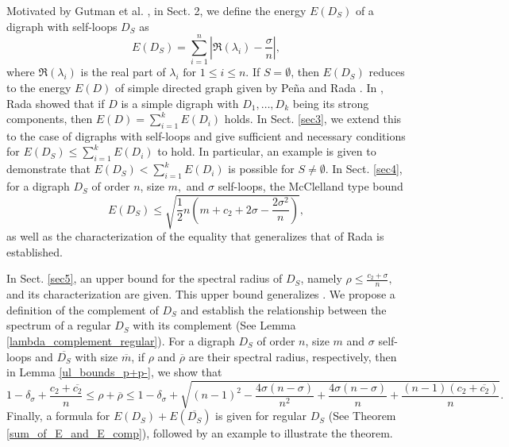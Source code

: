 \documentclass[12pt,a4paper,reqno]{amsart}
\numberwithin{equation}{section}
\theoremstyle{plain}
\theoremstyle{definition}
\newcommand{\<}{\langle}
\renewcommand{\>}{\rangle}
\begin{document}
    Motivated by Gutman et al. \cite{gutman2021energy}, in Sect. 2, we define the energy $E(D_S)$ of a digraph with self-loops $D_S$ as 
    \begin{equation*}
    E(D_S)=\sum_{i=1}^n \left | \Re(\lambda_i)-\frac{\sigma}{n} \right|,
    \end{equation*}
    where $\Re(\lambda_i)$ is the real part of $\lambda_i \text{ for } 1 \leq i \leq n$. If $S=\emptyset$, then $E(D_S)$ reduces to the energy $E(D)$ of simple directed graph given by Pe\~{n}a and Rada \cite{pena2008energy}. In \cite{rada2009mcclelland}, Rada showed that if $D$ is a simple digraph with $D_1, \ldots, D_k$ being its strong components, then $E(D)=\sum_{i=1}^k E(D_i)$ holds. In Sect. \ref{sec3}, we extend this to the case of digraphs with self-loops and give sufficient and necessary conditions for $E(D_S)\leq \sum_{i=1}^k E(D_i)$ to hold. In particular, an example is given to demonstrate that $E(D_S) < \sum_{i=1}^k E(D_i)$ is possible for $S \neq \emptyset$. In Sect. \ref{sec4}, for a digraph $D_S$ of order $n$, size $m,$ and $\sigma$ self-loops, the McClelland type bound 
    $$E(D_S)\leq \sqrt{\frac{1}{2}n \left(m+c_2+2\sigma-\frac{2\sigma^2}{n} \right)},$$ 
    as well as the characterization of the equality that generalizes that of Rada \cite{rada2009mcclelland} is established. 
    
    In Sect. \ref{sec5}, an upper bound for the spectral radius of $D_S$, namely $\rho \leq \frac{c_2+\sigma}{n},$ and its characterization are given. This upper bound generalizes %
    \cite[Theorem 2.1]{gudino2010lowerboundofspectral}. We propose a definition of the complement of $D_S$ and establish the relationship between the spectrum of a regular $D_S$ with its complement (See Lemma \ref{lambda_complement_regular}). For a digraph $D_S$ of order $n$, size $m$ and $\sigma$ self-loops and $\overline{D_S}$ with size $\overline{m}$, if $\rho$ and $\overline{\rho}$ are their spectral radius, respectively, then in Lemma \ref{ul_bounds_p+p-}, we show that
        \begin{equation*}
            \label{ul_bounds_p+p-}
            1-\delta_\sigma+\frac{c_2+\overline{c_2}}{n} \leq \rho+ \overline{\rho} \leq 1-\delta_\sigma + \sqrt{ (n-1)^2-\frac{4\sigma(n-\sigma)}{n^2} + \frac{4\sigma(n-\sigma)}{n}+\frac{(n-1)(c_2+\overline{c_2})}{n} }.
        \end{equation*}
    Finally, a formula for $E(D_S)+E(\overline{D_S})$ is given for regular $D_S$ (See Theorem \ref{sum_of_E_and_E_comp}), followed by an example to illustrate the theorem.
\end{document}
